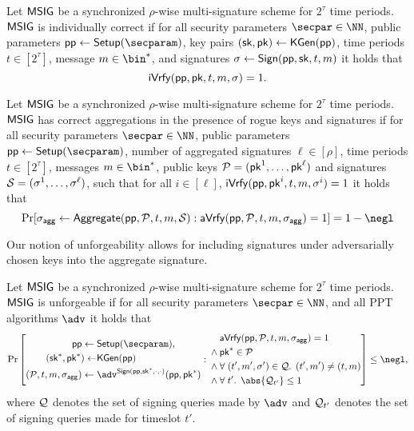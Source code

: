 \begin{definition}
  Let $\mathsf{MSIG}$ be a synchronized $\rho$-wise multi-signature scheme for $2^\tau$ time periods.
  $\mathsf{MSIG}$ is individually correct if for all security parameters $\secpar\in\NN$, public parameters $\params\gets\setup(\secparam)$, key pairs $(\mathsf{sk},\mathsf{pk})\gets\mathsf{KGen}(\mathsf{pp})$, time periods $t\in[2^\tau]$, message $m\in\bin^*$, and signatures $\sigma\gets\mathsf{Sign}(\mathsf{pp},\mathsf{sk},t,m)$ it holds that \[\mathsf{iVrfy}(\mathsf{pp},\mathsf{pk},t,m,\sigma) = 1.\]
\end{definition}

\begin{definition}
  Let $\mathsf{MSIG}$ be a synchronized $\rho$-wise multi-signature scheme for $2^\tau$ time periods.
  $\mathsf{MSIG}$ has correct aggregations in the presence of rogue keys and signatures if for all security parameters $\secpar\in\NN$, public parameters $\params\gets\setup(\secparam)$, number of aggregated signatures $\ell\in[\rho]$, time periods $t\in[2^\tau]$, messages $m\in\bin^*$, public keys $\mathcal{P} = (\mathsf{pk}^1,\dots,\mathsf{pk}^\ell)$ and signatures $\mathcal{S} = (\sigma^1,\dots,\sigma^\ell)$, such that for all $i\in[\ell]$, $\mathsf{iVrfy}(\mathsf{pp},\mathsf{pk}^i,t,m,\sigma^i) = 1$ it holds that
  \[
  \Pr[\aggsig\gets\aggregate(\params,\pubkeys,t,m,\signatures): \averify(\params,\pubkeys,t,m,\aggsig)=1]=1-\negl
  \]
\end{definition}

Our notion of unforgeability allows for including signatures under adversarially chosen keys into the aggregate signature.

\begin{definition}[Unforgeability]\label{def:multisigunforge}
  Let $\mathsf{MSIG}$ be a synchronized $\rho$-wise multi-signature scheme for $2^\tau$ time periods.
  $\mathsf{MSIG}$ is unforgeable if for all security parameters $\secpar\in\NN$, and all PPT algorithms $\adv$ it holds that
\[
  \Pr\left[\begin{aligned}\params\gets{}&\setup(\secparam),\\ (\sk^*,\pk^*)\gets&\kgen(\params)\\(\pubkeys,t,m,\aggsig)\gets{}&\adv^{\sign(\params,\sk^*,\cdot,\cdot)}(\params,\pk^*)\end{aligned}: 
  \begin{aligned}
  &\averify(\params,\pubkeys,t,m,\aggsig)=1\\
  {}\land{}&\pk^*\in\pubkeys\\
  {}\land{}&\forall\; (t',m',\sigma') \in\queries\ldotp\; (t',m') \neq (t,m)\\
  {}\land{}&\forall\; t' \ldotp\;\abs{\queries_{t'}}\leq 1
  \end{aligned}\right] \leq \negl,
\]
where $\mathcal{Q}$ denotes the set of signing queries made by $\adv$ and $\mathcal{Q}_{t'}$ denotes the set of signing queries made for timeslot $t'$.
\end{definition}

